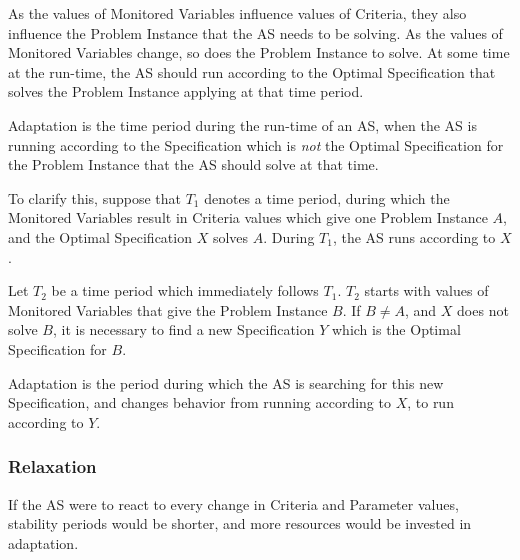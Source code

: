 \documentclass[graybox]{svmult}
\newcommand{\zi}[1]{\textit{#1}}
\newcommand{\AS}{AS}
\newcommand{\SolutionSpace}{Solution Space}
\newcommand{\ProblemSpace}{Problem Space}
\newcommand{\Specification}{Specification}
\newcommand{\Criteria}{Criteria}
\newcommand{\ProblemInstance}{Problem Instance}
\newcommand{\Parameter}{Parameter}
\newcommand{\OptimalSpecification}{Optimal Specification}
\newcommand{\MonitoredVariable}{Monitored Variable}
\begin{document}

As the values of \MonitoredVariable s influence values of \Criteria, they also influence the \ProblemInstance{} that the \AS{} needs to be solving. As the values of \MonitoredVariable s change, so does the \ProblemInstance{} to solve. At some time at the run-time, the \AS{} should run according to the \OptimalSpecification{} that solves the \ProblemInstance{} applying at that time period. 

Adaptation is the time period during the run-time of an \AS, when the \AS{} is running according to the \Specification{} which is \zi{not} the \OptimalSpecification{} for the \ProblemInstance{} that the \AS{} should solve at that time. 

To clarify this, suppose that $T_{1}$ denotes a time period, during which the \MonitoredVariable s result in \Criteria{} values which give one \ProblemInstance{} $A$, and the \OptimalSpecification{} $X$ solves $A$. During $T_{1}$, the \AS{} runs according to $X$. 

Let $T_{2}$ be a time period which immediately follows $T_{1}$. $T_{2}$ starts with values of \MonitoredVariable s that give the \ProblemInstance{} $B$. If $B \neq A$, and $X$ does not solve $B$, it is necessary to find a new \Specification{} $Y$ which is the \OptimalSpecification{} for $B$. 

Adaptation is the period during which the \AS{} is searching for this new \Specification, and changes behavior from running according to $X$, to run according to $Y$.

%
\subsubsection{Relaxation}\label{s:rpas:premises:relaxation}
If the \AS{} were to react to every change in \Criteria{} and \Parameter{} values, stability periods would be shorter, and more resources would be invested in adaptation. 
\end{document}
